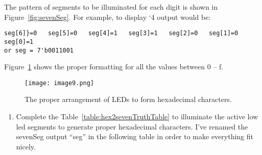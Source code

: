 The pattern of segments to be illuminated for each digit is shown in
Figure~\ref{fig:sevenSeg}. For example, to display `4 output would be:

\begin{verbatim}
seg[6]}=0   seg[5]=0   seg[4]=1   seg[3]=1   seg[2]=0   seg[1]=0   seg[0]=1
or seg = 7'b0011001
\end{verbatim}

Figure~\ref{fig:sevenSegChars} shows the proper formatting for all the values between 0 -- f.

\begin{figure}[ht]
\texttt{[image: image9.png]}
\caption{The proper arrangement of LEDs to form hexadecimal characters.}
\label{fig:sevenSegChars}
\end{figure}

\begin{enumerate}
\def\labelenumi{\arabic{enumi}.}
\item
  Complete the Table~\ref{table:hex2sevenTruthTable} to illuminate the active low led segments
  to generate proper hexadecimal characters. I've renamed the sevenSeg
  output ``seg'' in the following table in order to make everything fit
  nicely.
\end{enumerate}


